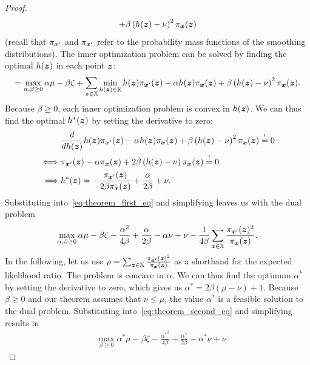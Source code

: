\begin{proof}
\begin{equation}
    +
    \beta \left(h({\bm{z}}) - \nu \right)^2 \pi_{{\bm{x}}}({\bm{z}})
\end{equation}
(recall that $\pi_{{\bm{x}}'}$ and $\pi_{{\bm{x}}'}$ refer to the probability mass functions of the smoothing distributions).
The inner optimization problem can be solved by finding the optimal $h({\bm{z}})$ in each point ${\bm{z}}$:
\begin{equation}
    = \max_{\alpha,\beta \geq 0} \alpha \mu - \beta \zeta
    +
    \sum_{{\bm{z}} \in {\mathbb{X}}}
    \min_{h({\bm{z}}) \in {\mathbb{R}}}
    h({\bm{z}}) \pi_{{\bm{x}}'}({\bm{z}})
    -
    \alpha h({\bm{z}}) \pi_{{\bm{x}}}({\bm{z}})
    +
    \beta \left(h({\bm{z}}) - \nu \right)^2 \pi_{{\bm{x}}}({\bm{z}}).
\end{equation}
Because $\beta \geq 0$, each inner optimization problem is convex in $h({\bm{z}})$. We can thus find the optimal $h^*({\bm{z}})$ by setting the derivative to zero:
\begin{align}
    &\frac{d}{d h({\bm{z}})} h({\bm{z}}) \pi_{{\bm{x}}'}({\bm{z}})
    -
    \alpha h({\bm{z}}) \pi_{{\bm{x}}}({\bm{z}})
    +
    \beta \left(h({\bm{z}}) - \nu \right)^2 \pi_{{\bm{x}}}({\bm{z}}) \overset{!}{=} 0 \\
    \iff
    & \pi_{{\bm{x}}'}({\bm{z}}) - \alpha \pi_{{\bm{x}}}({\bm{z}}) + 2 \beta \left(h({\bm{z}}) - \nu\right) \pi_{{\bm{x}}}({\bm{z}}) \overset{!}{=} 0 \\
    \implies
    & h^*({\bm{z}}) = - \frac{\pi_{{\bm{x}}'}({\bm{z}})}{2 \beta \pi_{{\bm{x}}}({\bm{z}})} + \frac{\alpha}{2\beta} + \nu.
\end{align}
Substituting into~\autoref{eq:theorem_first_eq} and simplifying leaves us with the dual problem
\begin{equation}\label{eq:theorem_second_eq}
    \max_{\alpha,\beta \geq 0} \alpha \mu - \beta \zeta
    - \frac{\alpha^2}{4 \beta} + \frac{\alpha}{2 \beta} - \alpha \nu + \nu
    - \frac{1}{4 \beta}
    \sum_{{\bm{z}} \in {\mathbb{X}}}
    \frac{\pi_{{\bm{x}}'}({\bm{z}})^2}{\pi_{{\bm{x}}}({\bm{z}})}.
\end{equation}
In the following, let us use 
    $\rho = \sum_{{\bm{z}} \in {\mathbb{X}}}
    \frac{\pi_{{\bm{x}}'}({\bm{z}})^2}{\pi_{{\bm{x}}}({\bm{z}})}$
    as a shorthand for the expected likelihood ratio.
The problem is concave in $\alpha$. We can thus find the optimum $\alpha^*$ by setting the derivative to zero, which gives us $\alpha^* = 2 \beta (\mu - \nu) + 1$. Because $\beta \geq 0$ and our theorem assumes that $\nu \leq \mu$, the value $\alpha^*$ is a feasible solution to the dual problem.
Substituting into~\autoref{eq:theorem_second_eq} and simplifying results in 
\begin{align}
    & \max_{\beta \geq 0} \alpha^* \mu - \beta \zeta
    - \frac{{\alpha^*}^2}{4 \beta} + \frac{\alpha^*}{2 \beta} - \alpha^* \nu + \nu

\end{align}
\end{proof}
